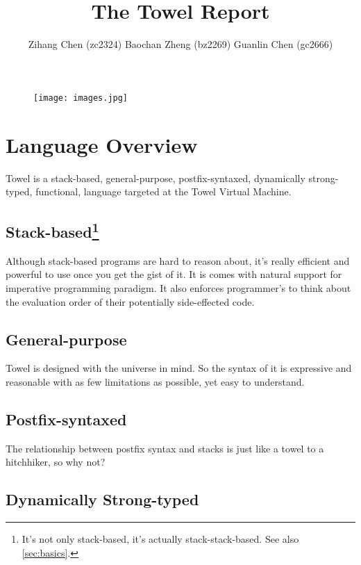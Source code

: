 \documentclass{report}
\title{The Towel Report}
\author{Zihang Chen (zc2324) Baochan Zheng (bz2269) Guanlin Chen (gc2666)}
\begin{document}
\maketitle

\vspace{10cm}
\begin{figure}
\centerline{\texttt{[image: images.jpg]}}
\end{figure}
\newpage

\tableofcontents

\chapter{Language Overview}\label{chap:overview}

Towel is a stack-based, general-purpose, postfix-syntaxed, dynamically strong-typed, functional, language targeted at the Towel Virtual Machine.

\section[Stack-based]{Stack-based\footnote{It's not only stack-based, it's actually stack-stack-based. See also \autoref{sec:basics}.}}

Although stack-based programs are hard to reason about, it's really efficient and powerful to use once you get the gist of it. It is comes with natural support for imperative programming paradigm. It also enforces programmer's to think about the evaluation order of their potentially side-effected code.

\section{General-purpose}

Towel is designed with the universe in mind. So the syntax of it is expressive and reasonable with as few limitations as possible, yet easy to understand.

\section{Postfix-syntaxed}

The relationship between postfix syntax and stacks is just like a towel to a hitchhiker, so why not?

\section{Dynamically Strong-typed}
\end{document}
